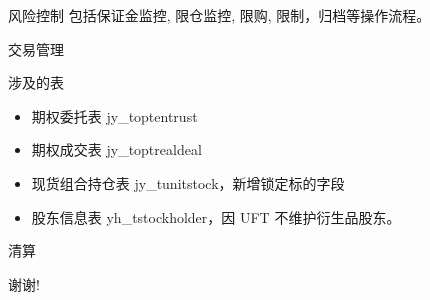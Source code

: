 \documentclass[12pt]{ctexbeamer}	%
\begin{document}
\begin{frame}{风险控制}
  包括保证金监控, 限仓监控, 限购, 限制，归档等操作流程。
\end{frame}

\begin{frame}{交易管理}
  \begin{block}{涉及的表}
    \begin{itemize}
      \item 期权委托表 jy_toptentrust
      \item 期权成交表 jy_toptrealdeal
      \item 现货组合持仓表 jy_tunitstock，新增锁定标的字段
      \item 股东信息表 yh_tstockholder，因 UFT 不维护衍生品股东。
    \end{itemize}
  \end{block}
\end{frame}

\begin{frame}{清算}
\end{frame}


\begin{frame}
\centerline{\Large 谢谢!}
\end{frame}
\end{document}
